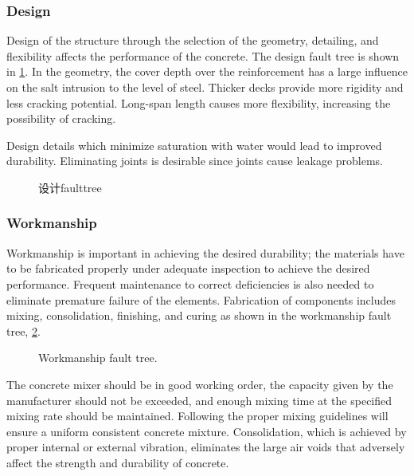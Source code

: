 \subsubsection{Design}
Design of the structure through the selection of the geometry, detailing, and flexibility affects the performance of the concrete. The design fault tree is shown in \cref{fig:faulttree-design}. In the geometry, the cover depth over the reinforcement has a large influence on the salt intrusion to the level of steel. Thicker decks provide more rigidity and less cracking potential. Long-span length causes more flexibility, increasing the possibility of cracking.

Design details which minimize saturation with water would lead to improved durability. Eliminating joints is desirable since joints cause leakage problems.

\begin{figure}
  \caption{设计\gls*{faulttree}}
  \label{fig:faulttree-design}
\end{figure}

\subsubsection{Workmanship}
Workmanship is important in achieving the desired durability; the materials have to be fabricated properly under adequate inspection to achieve the desired performance. Frequent maintenance to correct deficiencies is also needed to eliminate premature failure of the elements. Fabrication of components includes mixing, consolidation, finishing, and curing as shown in the workmanship fault tree, \cref{fig:fault-tree-workmanship}.

\begin{figure}
  \caption{Workmanship fault tree.}
  \label{fig:fault-tree-workmanship}
\end{figure}

The concrete mixer should be in good working order, the capacity given by the manufacturer should not be exceeded, and enough mixing time at the specified mixing rate should be maintained. Following the proper mixing guidelines will ensure a uniform consistent concrete mixture. Consolidation, which is achieved by proper internal or external vibration, eliminates the large air voids that adversely affect the strength and durability of concrete.

